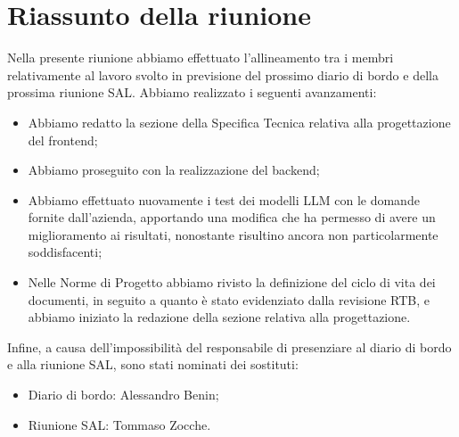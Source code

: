 \section{Riassunto della riunione}
Nella presente riunione abbiamo effettuato l'allineamento tra i membri relativamente al lavoro svolto in previsione del prossimo diario di bordo e della prossima riunione SAL. Abbiamo realizzato i seguenti avanzamenti:
\begin{itemize}
    \item Abbiamo redatto la sezione della Specifica Tecnica relativa alla progettazione del frontend;
    \item Abbiamo proseguito con la realizzazione del backend;
    \item Abbiamo effettuato nuovamente i test dei modelli LLM con le domande fornite dall'azienda, apportando una modifica che ha permesso di avere un miglioramento ai risultati, nonostante risultino ancora non particolarmente soddisfacenti;
    \item Nelle Norme di Progetto abbiamo rivisto la definizione del ciclo di vita dei documenti, in seguito a quanto è stato evidenziato dalla revisione RTB, e abbiamo iniziato la redazione della sezione relativa alla progettazione.
\end{itemize}
Infine, a causa dell'impossibilità del responsabile di presenziare al diario di bordo e alla riunione SAL, sono stati nominati dei sostituti:
\begin{itemize}
    \item Diario di bordo: Alessandro Benin;
    \item Riunione SAL: Tommaso Zocche.
\end{itemize}